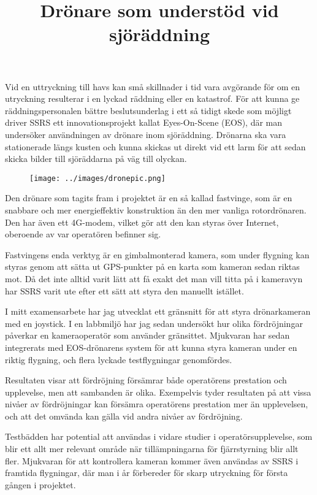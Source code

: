 \documentclass{popsci}
\title{Drönare som understöd vid sjöräddning}
\begin{document}

{\noindent Vid en uttryckning till havs kan små skillnader i tid vara avgörande för om en utryckning resulterar i en lyckad räddning eller en katastrof. För att kunna ge räddningspersonalen bättre beslutsunderlag i ett så tidigt skede som möjligt driver SSRS ett innovationsprojekt kallat Eyes-On-Scene (EOS), där man undersöker användningen av drönare inom sjöräddning. Drönarna ska vara stationerade längs kusten och kunna skickas ut direkt vid ett larm för att sedan skicka bilder till sjöräddarna på väg till olyckan.

\begin{figure}[!bth] %
    \texttt{[image: ../images/dronepic.png]} 
\end{figure}

Den drönare som tagits fram i projektet är en så kallad fastvinge, som är en snabbare och mer energieffektiv konstruktion än den mer vanliga rotordrönaren. Den har även ett 4G-modem, vilket gör att den kan styras över Internet, oberoende av var operatören befinner sig. 

Fastvingens enda verktyg är en gimbalmonterad kamera, som under flygning kan styras genom att sätta ut GPS-punkter på en karta som kameran sedan riktas mot. Då det inte alltid varit lätt att få exakt det man vill titta på i kameravyn har SSRS varit ute efter ett sätt att styra den manuellt istället.

I mitt examensarbete har jag utvecklat ett gränsnitt för att styra drönarkameran med en joystick. I en labbmiljö har jag sedan undersökt hur olika fördröjningar påverkar en kameraoperatör som använder gränsittet. Mjukvaran har sedan integrerats med EOS-drönarens system för att kunna styra kameran under en riktig flygning, och flera lyckade testflygningar genomfördes. 

Resultaten visar att fördröjning försämrar både operatörens prestation och upplevelse, men att sambanden är olika. Exempelvis tyder resultaten på att vissa nivåer av fördröjningar kan försämra operatörens prestation mer än upplevelsen, och att det omvända kan gälla vid andra nivåer av fördröjning.

Testbädden har potential att användas i vidare studier i operatörsupplevelse, som blir ett allt mer relevant område när tillämpningarna för fjärrstyrning blir allt fler. Mjukvaran för att kontrollera kameran kommer även användas av SSRS i framtida flygningar, där man i år förbereder för skarp utryckning för första gången i projektet.
}
\end{document}
